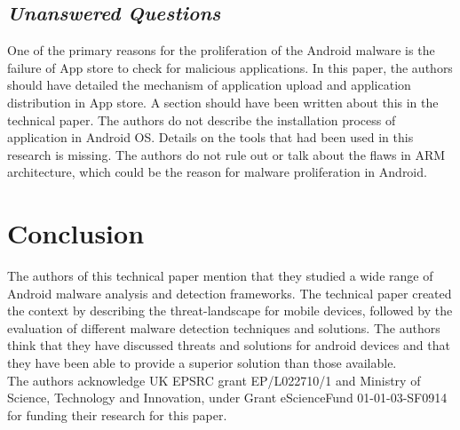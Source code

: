 \documentclass[letterpaper,10pt]{texMemo}
\begin{document}
\subsection*{\textit{Unanswered Questions}}\label{ref:critique_method}
One of the primary reasons for the proliferation of the Android malware is the failure of App store to check for malicious applications. In this paper, the authors should have detailed the mechanism of application upload and application distribution in App store. A section should have been written about this in the technical paper. The authors do not describe the installation process of application in Android OS. Details on the tools that had been used in this research is missing. The authors do not rule out or talk about the flaws in ARM architecture, which could be the reason for malware proliferation in Android.

\section*{Conclusion}
The authors of this technical paper mention that they studied a wide range of Android malware analysis and detection frameworks. The technical paper created the context by describing the threat-landscape for mobile devices, followed by the evaluation of different malware detection techniques and solutions. The authors think that they have discussed threats and solutions for android devices and that they have been able to provide a superior solution than those available.\\
The authors acknowledge UK EPSRC grant EP/L022710/1 and Ministry of Science, Technology and Innovation, under Grant eScienceFund 01-01-03-SF0914 for funding their research for this paper.

\end{document}
